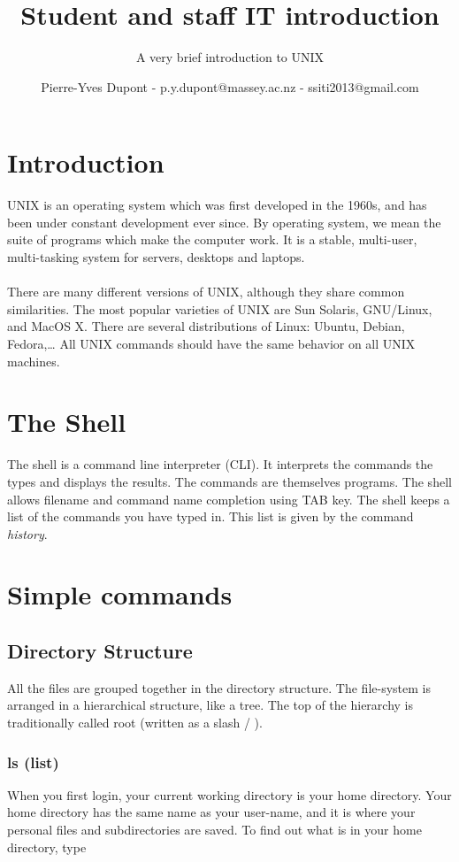 \documentclass[two_sides]{my_article}
\title{Student and staff IT introduction}
\subtitle{A very brief introduction to UNIX}
\author{Pierre-Yves Dupont - p.y.dupont@massey.ac.nz - ssiti2013@gmail.com}
\date{}
\begin{document}
\maketitle

\section{Introduction}
UNIX is an operating system which was first developed in the 1960s, and has been under constant development ever since. By operating system, we mean the suite of programs which make the computer work. It is a stable, multi-user, multi-tasking system for servers, desktops and laptops.
\paragraph{}
There are many different versions of UNIX, although they share common similarities. The most popular varieties of UNIX are Sun Solaris, GNU/Linux, and MacOS X. There are several distributions of Linux: Ubuntu, Debian, Fedora,\dots
All UNIX commands should have the same behavior on all UNIX machines.

\section{The Shell}
The shell is a command line interpreter (CLI). It interprets the commands the types and displays the results. The commands are themselves programs.
The shell allows filename and command name completion using TAB key.
The shell keeps a list of the commands you have typed in. This list is given by the command \emph{history}.

\section{Simple commands}

\subsection{Directory Structure}

All the files are grouped together in the directory structure. The file-system is arranged in a hierarchical structure, like a tree. The top of the hierarchy is traditionally called root (written as a slash / ).

\subsubsection{ls (list)}
When you first login, your current working directory is your home directory. Your home directory has the same name as your user-name, and it is where your personal files and subdirectories are saved.
To find out what is in your home directory, type
\end{document}
